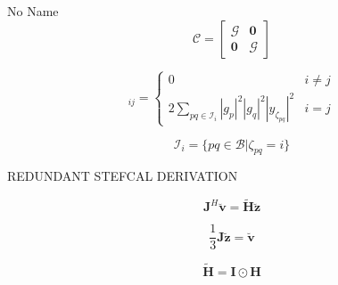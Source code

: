 \documentclass[a4paper,10pt]{article}
\begin{document}
\begin{section}{No Name}
\begin{equation}
\boldsymbol{\mathcal{C}} =
\begin{bmatrix}
\boldsymbol{\mathcal{G}} & \boldsymbol{0}\\
\boldsymbol{0} & \boldsymbol{\mathcal{G}}
\end{bmatrix}
\end{equation}

\begin{equation}
 [\boldsymbol{\mathcal{G}}]_{ij} = 
\begin{cases}
0 & i\neq j\\
2\sum_{pq\in\mathcal{I}_{i}} |g_p|^2|g_q|^2|y_{\zeta_{pq}}|^2 & i=j
\end{cases}
\end{equation}

\begin{equation}
\mathcal{I}_i = \{pq\in\mathcal{B}|\zeta_{pq}=i\} 
\end{equation}

REDUNDANT STEFCAL DERIVATION

\begin{equation}
\boldsymbol{J}^H\breve{\boldsymbol{v}} = \widetilde{\boldsymbol{H}}\breve{\boldsymbol{z}} 
\end{equation}

\begin{equation}
\frac{1}{3} \boldsymbol{J}\breve{\boldsymbol{z}} = \breve{\boldsymbol{v}}
\end{equation}

\begin{equation}
\widetilde{\boldsymbol{H}} = \boldsymbol{I}\odot\boldsymbol{H} 
\end{equation}

\end{section}
\end{document}
